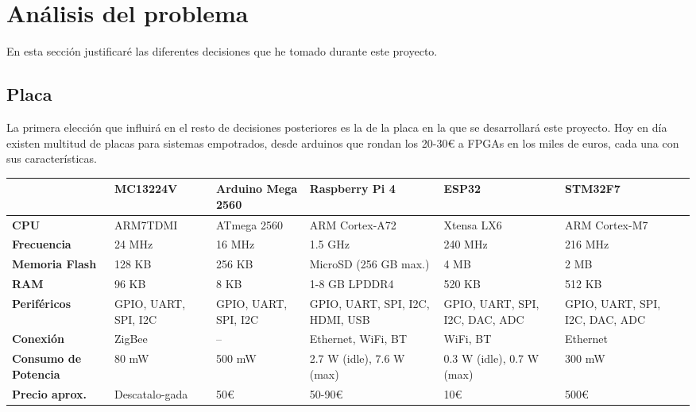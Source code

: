 \chapter{Análisis del problema}

En esta sección justificaré las diferentes decisiones que he tomado durante este proyecto.

\section{Placa}
La primera elección que influirá en el resto de decisiones posteriores es la de la placa en la que se desarrollará este proyecto. Hoy en día existen multitud de placas para sistemas empotrados, desde arduinos que rondan los 20-30€ a FPGAs en los miles de euros, cada una con sus características.

\begin{table}
\centering
\renewcommand{\arraystretch}{1.5}
\begin{tabularx}{\textwidth}{|X|X|X|X|X|X|}
\hline
\textbf{} & \textbf{MC13224V} & \textbf{Arduino Mega 2560} & \textbf{Raspberry Pi 4} & \textbf{ESP32} & \textbf{STM32F7} \\ \hline
\textbf{CPU} & ARM7TDMI & ATmega 2560 & ARM Cortex-A72 & Xtensa LX6 & ARM Cortex-M7 \\ \hline
\textbf{Frecuencia} & 24 MHz & 16 MHz & 1.5 GHz & 240 MHz & 216 MHz \\ \hline
\textbf{Memoria Flash} & 128 KB & 256 KB & MicroSD (256 GB max.) & 4 MB & 2 MB \\ \hline
\textbf{RAM} & 96 KB & 8 KB & 1-8 GB LPDDR4 & 520 KB & 512 KB \\ \hline
\textbf{Periféricos} & GPIO, UART, SPI, I2C & GPIO, UART, SPI, I2C & GPIO, UART, SPI, I2C, HDMI, USB & GPIO, UART, SPI, I2C, DAC, ADC & GPIO, UART, SPI, I2C, DAC, ADC \\ \hline
\textbf{Conexión} & ZigBee & -- & Ethernet, WiFi, BT & WiFi, BT & Ethernet \\ \hline
\textbf{Consumo de Potencia} & 80 mW & 500 mW & 2.7 W (idle), 7.6 W (max) & 0.3 W (idle), 0.7 W (max) & 300 mW \\ \hline
\textbf{Precio aprox.} & Descatalo-gada & 50€ & 50-90€ & 10€ & 500€ \\ \hline
\end{tabularx}
\end{table}

